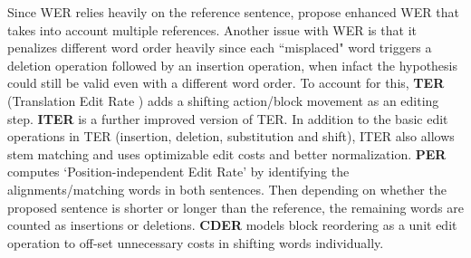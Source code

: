 Since WER relies heavily on the reference sentence,   propose enhanced WER that takes into account multiple references. Another issue with WER is that it penalizes different word order heavily since each ``misplaced" word triggers a deletion operation followed by an insertion operation, when infact the hypothesis could still be valid even with a different word order.
To account for this, \textbf{TER} (Translation Edit Rate ) adds a shifting action/block movement as an editing step. 
\textbf{ITER}  is a further improved version of TER. In addition to the basic edit operations in TER (insertion, deletion, substitution and shift), ITER also allows stem matching and uses optimizable edit costs and better normalization. \textbf{PER}  computes `Position-independent Edit Rate' by identifying the alignments/matching words in both sentences. Then depending on whether the proposed sentence is shorter or longer than the reference, the remaining words are counted as insertions or deletions.
\textbf{CDER}  models block reordering as a unit edit operation to off-set unnecessary costs in shifting words individually.

